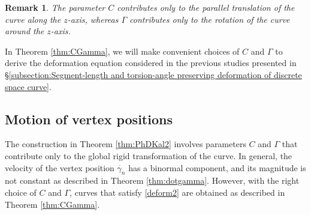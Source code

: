 \documentclass[10pt,leqno]{amsart}
\newtheorem{remark}[theorem]{Remark}
\numberwithin{equation}{section}
\begin{document}
\begin{remark}\label{C_and_Gamma}
The parameter
$C$ contributes only to the parallel translation of the curve along the $z$-axis, whereas $\Gamma$  contributes only to the rotation of the curve around the $z$-axis.
\end{remark}

In Theorem \ref{thm:CGamma}, we will make convenient choices of $C$ and $\Gamma$ to derive the deformation equation considered in the previous studies presented in \S\ref{subsection:Segment-length and torsion-angle preserving deformation of discrete space curve}. 





\subsection{Motion of vertex positions}\label{subsection:Motion of vertex positions} 
The construction in Theorem \ref{thm:PhDKal2}
involves parameters $C$ and $\Gamma$ that contribute only to the global rigid transformation of the curve.
In general, the velocity of the vertex position $\dot{\gamma_n}$ has a binormal component, and its magnitude is not constant as described in Theorem \ref{thm:dotgamma}.
However, with the right choice of $C$ and $\Gamma$,
curves that satisfy \eqref{deform2} 
are obtained as described in Theorem \ref{thm:CGamma}.
\end{document}
